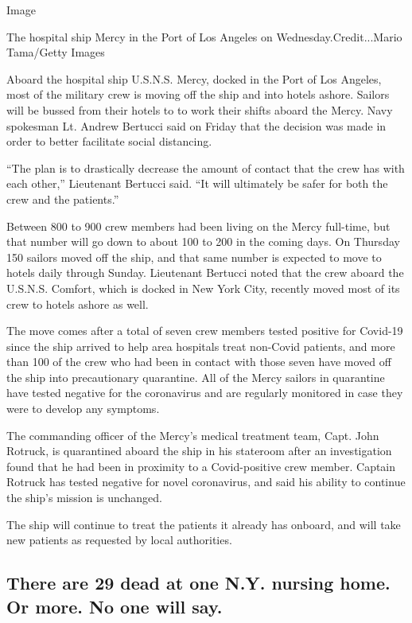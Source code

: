 Image

The hospital ship Mercy in the Port of Los Angeles on
Wednesday.Credit...Mario Tama/Getty Images

Aboard the hospital ship U.S.N.S. Mercy, docked in the Port of Los
Angeles, most of the military crew is moving off the ship and into
hotels ashore. Sailors will be bussed from their hotels to to work their
shifts aboard the Mercy. Navy spokesman Lt. Andrew Bertucci said on
Friday that the decision was made in order to better facilitate social
distancing.

``The plan is to drastically decrease the amount of contact that the
crew has with each other,'' Lieutenant Bertucci said. ``It will
ultimately be safer for both the crew and the patients.''

Between 800 to 900 crew members had been living on the Mercy full-time,
but that number will go down to about 100 to 200 in the coming days. On
Thursday 150 sailors moved off the ship, and that same number is
expected to move to hotels daily through Sunday. Lieutenant Bertucci
noted that the crew aboard the U.S.N.S. Comfort, which is docked in New
York City, recently moved most of its crew to hotels ashore as well.

The move comes after a total of seven crew members tested positive for
Covid-19 since the ship arrived to help area hospitals treat non-Covid
patients, and more than 100 of the crew who had been in contact with
those seven have moved off the ship into precautionary quarantine. All
of the Mercy sailors in quarantine have tested negative for the
coronavirus and are regularly monitored in case they were to develop any
symptoms.

The commanding officer of the Mercy's medical treatment team, Capt. John
Rotruck, is quarantined aboard the ship in his stateroom after an
investigation found that he had been in proximity to a Covid-positive
crew member. Captain Rotruck has tested negative for novel coronavirus,
and said his ability to continue the ship's mission is unchanged.

The ship will continue to treat the patients it already has onboard, and
will take new patients as requested by local authorities.

\hypertarget{there-are-29-dead-at-one-ny-nursing-home-or-more-no-one-will-say}{%
\subsection{There are 29 dead at one N.Y. nursing home. Or more. No one
will
say.}\label{there-are-29-dead-at-one-ny-nursing-home-or-more-no-one-will-say}}

